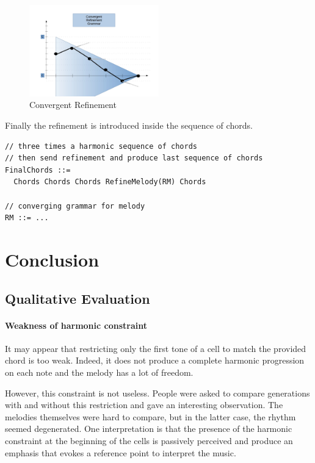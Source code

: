 \documentclass[twocolumn, 11pt]{article}
\begin{document}
\begin{figure}[h]
  \centering
  \includegraphics[width=0.5\textwidth]{converge}
  \caption{Convergent Refinement}
  \label{fig:converge}
\end{figure}

Finally the refinement is introduced inside the sequence of chords.

\begin{lstlisting}
// three times a harmonic sequence of chords
// then send refinement and produce last sequence of chords
FinalChords ::=
  Chords Chords Chords RefineMelody(RM) Chords

// converging grammar for melody
RM ::= ...
\end{lstlisting}


\section{Conclusion}

\subsection{Qualitative Evaluation}

\paragraph{Weakness of harmonic constraint}

It may appear that restricting only the first tone of a cell to match the provided chord is too weak. Indeed, it does not produce a complete harmonic progression on each note and the melody has a lot of freedom.

However, this constraint is not useless. People were asked to compare generations with and without this restriction and gave an interesting observation.
The melodies themselves were hard to compare, but in the latter case, the rhythm seemed degenerated. One interpretation is that the presence of the harmonic constraint at the beginning of the cells is passively perceived and produce an emphasis that evokes a reference point to interpret the music.
\end{document}
